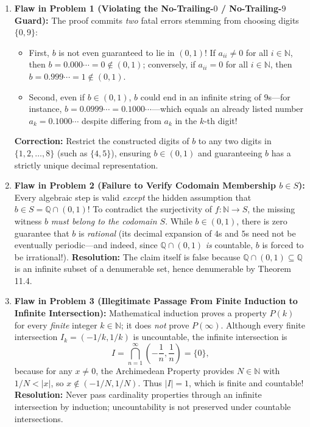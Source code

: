 \documentclass[11pt, letterpaper]{article}
\theoremstyle{definition}
\theoremstyle{remark}
\begin{document}
\begin{enumerate}
    \item \textbf{Flaw in Problem 1 (Violating the No-Trailing-$0$ / No-Trailing-$9$ Guard):}
    The proof commits \emph{two} fatal errors stemming from choosing digits $\{0, 9\}$:
    \begin{itemize}
        \item First, $b$ is not even guaranteed to lie in $(0, 1)$! If $a_{ii} \neq 0$ for all $i \in \mathbb{N}$, then $b = 0.000\cdots = 0 \notin (0, 1)$; conversely, if $a_{ii} = 0$ for all $i \in \mathbb{N}$, then $b = 0.999\cdots = 1 \notin (0, 1)$.
        \item Second, even if $b \in (0, 1)$, $b$ could end in an infinite string of $9$s—for instance, $b = 0.0999\cdots = 0.1000\cdots$—which equals an already listed number $a_k = 0.1000\cdots$ despite differing from $a_k$ in the $k$-th digit!
    \end{itemize}
    \textbf{Correction:} Restrict the constructed digits of $b$ to any two digits in $\{1, 2, \dots, 8\}$ (such as $\{4, 5\}$), ensuring $b \in (0, 1)$ and guaranteeing $b$ has a strictly unique decimal representation.

    \item \textbf{Flaw in Problem 2 (Failure to Verify Codomain Membership $b \in S$):}
    Every algebraic step is valid \emph{except} the hidden assumption that $b \in S = \mathbb{Q} \cap (0, 1)$! To contradict the surjectivity of $f : \mathbb{N} \to S$, the missing witness $b$ \emph{must belong to the codomain $S$}. While $b \in (0, 1)$, there is zero guarantee that $b$ is \emph{rational} (its decimal expansion of $4$s and $5$s need not be eventually periodic—and indeed, since $\mathbb{Q} \cap (0, 1)$ \emph{is} countable, $b$ is forced to be irrational!).
    \textbf{Resolution:} The claim itself is false because $\mathbb{Q} \cap (0, 1) \subseteq \mathbb{Q}$ is an infinite subset of a denumerable set, hence denumerable by Theorem 11.4.

    \item \textbf{Flaw in Problem 3 (Illegitimate Passage From Finite Induction to Infinite Intersection):}
    Mathematical induction proves a property $P(k)$ for every \emph{finite} integer $k \in \mathbb{N}$; it does \emph{not} prove $P(\infty)$. Although every finite intersection $I_k = (-1/k, 1/k)$ is uncountable, the infinite intersection is
    \[
    I = \bigcap_{n=1}^{\infty} \left(-\frac{1}{n}, \frac{1}{n}\right) = \{0\},
    \]
    because for any $x \neq 0$, the Archimedean Property provides $N \in \mathbb{N}$ with $1/N < |x|$, so $x \notin (-1/N, 1/N)$. Thus $|I| = 1$, which is finite and countable!
    \textbf{Resolution:} Never pass cardinality properties through an infinite intersection by induction; uncountability is not preserved under countable intersections.


\end{enumerate}
\end{document}
